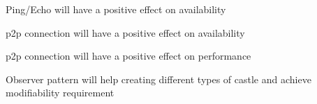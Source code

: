 
\begin{description}[style=nextline]
  \item[S1\label{s1}] Ping/Echo will have a positive effect on availability
  \item[S2\label{s2}] \gls{p2p} connection will have a positive effect on availability
  \item[S3\label{s3}] \gls{p2p} connection will have a positive effect on performance
  \item[S4\label{s4}] Observer pattern will help creating different types of castle and achieve modifiability requirement
\end{description}
